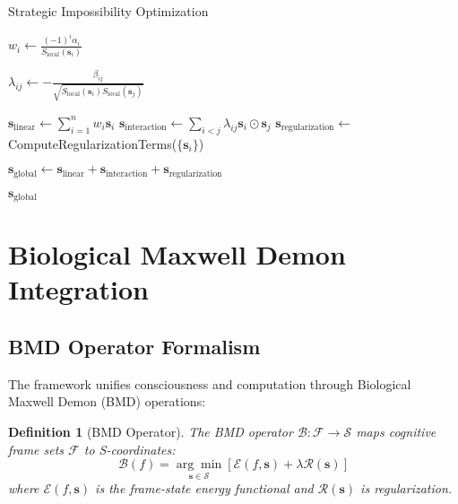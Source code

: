 \documentclass[11pt]{article}
\newtheorem{definition}{Definition}
\begin{document}
\begin{algorithm}
\caption{Strategic Impossibility Optimization}
\begin{algorithmic}[1]
        \State $w_i \gets \frac{(-1)^i \alpha_i}{S_{\text{local}}(\mathbf{s}_i)}$ 
    \EndFor
    
        \State $\lambda_{ij} \gets -\frac{\beta_{ij}}{\sqrt{S_{\text{local}}(\mathbf{s}_i) S_{\text{local}}(\mathbf{s}_j)}}$
    \EndFor
    
    \State $\mathbf{s}_{\text{linear}} \gets \sum_{i=1}^n w_i \mathbf{s}_i$
    \State $\mathbf{s}_{\text{interaction}} \gets \sum_{i<j} \lambda_{ij} \mathbf{s}_i \odot \mathbf{s}_j$
    \State $\mathbf{s}_{\text{regularization}} \gets$ ComputeRegularizationTerms($\{\mathbf{s}_i\}$)
    
    \State $\mathbf{s}_{\text{global}} \gets \mathbf{s}_{\text{linear}} + \mathbf{s}_{\text{interaction}} + \mathbf{s}_{\text{regularization}}$
    
    \State \Return $\mathbf{s}_{\text{global}}$ 
\EndProcedure
\end{algorithmic}
\end{algorithm}

\section{Biological Maxwell Demon Integration}

\subsection{BMD Operator Formalism}

The framework unifies consciousness and computation through Biological Maxwell Demon (BMD) operations:

\begin{definition}[BMD Operator]
The BMD operator $\mathcal{B}: \mathcal{F} \to \mathcal{S}$ maps cognitive frame sets $\mathcal{F}$ to S-coordinates:
\begin{equation}
\mathcal{B}(f) = \underset{\mathbf{s} \in \mathcal{S}}{\arg\min} \left[ \mathcal{E}(f, \mathbf{s}) + \lambda \mathcal{R}(\mathbf{s}) \right]
\end{equation}
where $\mathcal{E}(f, \mathbf{s})$ is the frame-state energy functional and $\mathcal{R}(\mathbf{s})$ is regularization.
\end{definition}
\end{document}
